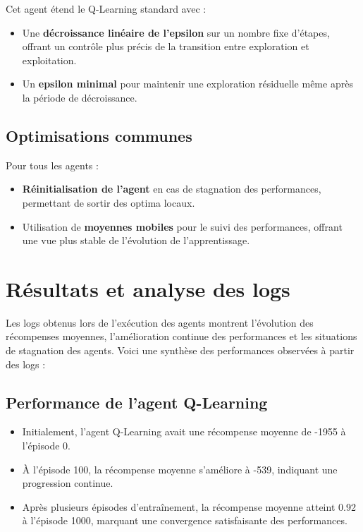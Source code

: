 \documentclass{article}
\begin{document}
Cet agent étend le Q-Learning standard avec :
\begin{itemize}
    \item Une \textbf{décroissance linéaire de l'epsilon} sur un nombre fixe d'étapes, offrant un contrôle plus précis de la transition entre exploration et exploitation.
    \item Un \textbf{epsilon minimal} pour maintenir une exploration résiduelle même après la période de décroissance.
\end{itemize}

\subsection{Optimisations communes}

Pour tous les agents :
\begin{itemize}
    \item \textbf{Réinitialisation de l'agent} en cas de stagnation des performances, permettant de sortir des optima locaux.
    \item Utilisation de \textbf{moyennes mobiles} pour le suivi des performances, offrant une vue plus stable de l'évolution de l'apprentissage.
\end{itemize}

\section{Résultats et analyse des logs}

Les logs obtenus lors de l'exécution des agents montrent l'évolution des récompenses moyennes, l'amélioration continue des performances et les situations de stagnation des agents. Voici une synthèse des performances observées à partir des logs :

\subsection{Performance de l'agent Q-Learning}
\begin{itemize}
    \item Initialement, l'agent Q-Learning avait une récompense moyenne de -1955 à l'épisode 0.
    \item À l'épisode 100, la récompense moyenne s'améliore à -539, indiquant une progression continue.
    \item Après plusieurs épisodes d'entraînement, la récompense moyenne atteint 0.92 à l'épisode 1000, marquant une convergence satisfaisante des performances.
\end{itemize}
\end{document}
